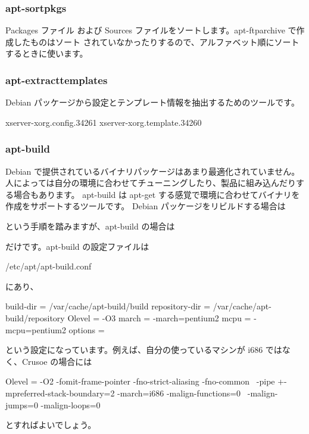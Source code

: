 \documentclass[mingoth,a4paper]{jsarticle}
\begin{document}
\subsubsection{apt-sortpkgs}
 Packages ファイル および Sources ファイルをソートします。apt-ftparchive で作成したものはソート
 されていなかったりするので、アルファベット順にソートするときに使います。
\begin{commandline}
\end{commandline} 

\subsubsection{apt-extracttemplates}
 Debian パッケージから設定とテンプレート情報を抽出するためのツールです。

\begin{commandline}
 xserver-xorg.config.34261
 xserver-xorg.template.34260
\end{commandline}

\subsubsection{apt-build}
 Debian で提供されているバイナリパッケージはあまり最適化されていません。
 人によっては自分の環境に合わせてチューニングしたり、製品に組み込んだりする場合もあります。
 apt-build は apt-get する感覚で環境に合わせてバイナリを作成をサポートするツールです。
 Debian パッケージをリビルドする場合は
 \begin{commandline}
 \end{commandline}
 という手順を踏みますが、apt-build の場合は
 \begin{commandline}
 \end{commandline}
 だけです。apt-build の設定ファイルは
 \begin{commandline}
 /etc/apt/apt-build.conf
 \end{commandline}
 にあり、
 \begin{commandline}
build-dir = /var/cache/apt-build/build
repository-dir = /var/cache/apt-build/repository
Olevel = -O3
march = -march=pentium2
mcpu = -mcpu=pentium2
options =
 \end{commandline}
 という設定になっています。例えば、自分の使っているマシンが i686 ではなく、Crusoe
 の場合には
\begin{commandline}
Olevel = 
-O2 -fomit-frame-pointer -fno-strict-aliasing -fno-common \ 
-pipe +-mpreferred-stack-boundary=2 -march=i686 -malign-functions=0 \
-malign-jumps=0 -malign-loops=0
\end{commandline}
とすればよいでしょう。
\end{document}
